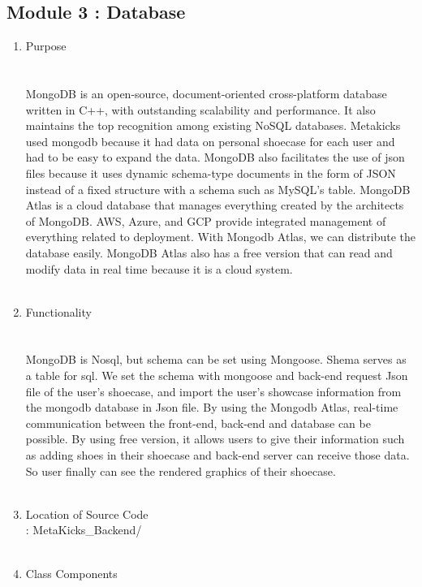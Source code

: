 \documentclass[conference]{IEEEtran}
\begin{document}
\subsection{Module 3 : Database}
\begin{enumerate}
\item Purpose\\
\\\\MongoDB is an open-source, document-oriented cross-platform database written in C++, with outstanding scalability and performance. It also maintains the top recognition among existing NoSQL databases. Metakicks used mongodb because it had data on personal shoecase for each user and had to be easy to expand the data. MongoDB also facilitates the use of json files because it uses dynamic schema-type documents in the form of JSON instead of a fixed structure with a schema such as MySQL's table. MongoDB Atlas is a cloud database that manages everything created by the architects of MongoDB. AWS, Azure, and GCP provide integrated management of everything related to deployment. With Mongodb Atlas, we can distribute the database easily. MongoDB Atlas also has a free version that can read and modify data in real time because it is a cloud system.\\\\
\item Functionality\\
\\\\MongoDB is Nosql, but schema can be set using Mongoose. Shema serves as a table for sql. We set the schema with mongoose and back-end request Json file of the user's shoecase, and import the user's showcase information from the mongodb database in Json file. By using the Mongodb Atlas, real-time communication between the front-end, back-end and database can be possible. By using free version, it allows users to give their information such as adding shoes in their shoecase and back-end server can receive those data. So user finally can see the rendered graphics of their shoecase. \\\\
\item Location of Source Code\\
: MetaKicks\_Backend/\\\\
\item Class Components\\


\end{enumerate}
\end{document}
